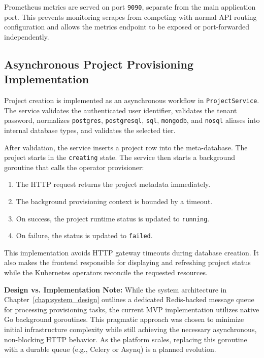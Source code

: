 Prometheus metrics are served on port \texttt{9090}, separate from the main application port. This prevents monitoring scrapes from competing with normal API routing configuration and allows the metrics endpoint to be exposed or port-forwarded independently.

\subsection{Asynchronous Project Provisioning Implementation}

Project creation is implemented as an asynchronous workflow in \texttt{ProjectService}. The service validates the authenticated user identifier, validates the tenant password, normalizes \texttt{postgres}, \texttt{postgresql}, \texttt{sql}, \texttt{mongodb}, and \texttt{nosql} aliases into internal database types, and validates the selected tier.

After validation, the service inserts a project row into the meta-database. The project starts in the \texttt{creating} state. The service then starts a background goroutine that calls the operator provisioner:

\begin{enumerate}
    \item The HTTP request returns the project metadata immediately.
    \item The background provisioning context is bounded by a timeout.
    \item On success, the project runtime status is updated to \texttt{running}.
    \item On failure, the status is updated to \texttt{failed}.
\end{enumerate}

This implementation avoids HTTP gateway timeouts during database creation. It also makes the frontend responsible for displaying and refreshing project status while the Kubernetes operators reconcile the requested resources. 

\textbf{Design vs. Implementation Note:} While the system architecture in Chapter~\ref{chap:system_design} outlines a dedicated Redis-backed message queue for processing provisioning tasks, the current MVP implementation utilizes native Go background goroutines. This pragmatic approach was chosen to minimize initial infrastructure complexity while still achieving the necessary asynchronous, non-blocking HTTP behavior. As the platform scales, replacing this goroutine with a durable queue (e.g., Celery or Asynq) is a planned evolution.


